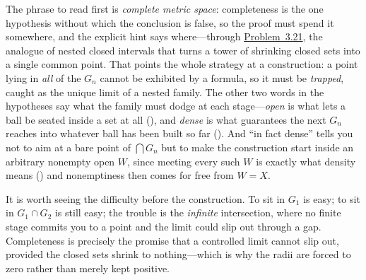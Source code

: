 \documentclass[main.tex]{subfiles}
\begin{document}
\begin{Reflection}
The phrase to read first is \emph{complete metric space}: completeness is the one hypothesis without which
the conclusion is false, so the proof must spend it somewhere, and the explicit hint says where---through
\hyperlink{prob:3.21}{Problem~3.21}, the analogue of nested closed intervals that turns a tower of
shrinking closed sets into a single common point. That points the whole strategy at a construction: a
point lying in \emph{all} of the $G_n$ cannot be exhibited by a formula, so it must be \emph{trapped},
caught as the unique limit of a nested family. The other two words in the hypotheses say what the family
must dodge at each stage---\emph{open} is what lets a ball be seated inside a set at all (),
and \emph{dense} is what guarantees the next $G_n$ reaches into whatever ball has been built so far
(). And ``in fact dense'' tells you not to aim at a bare point of $\bigcap G_n$ but to make
the construction start inside an arbitrary nonempty open $W$, since meeting every such $W$ is exactly what
density means () and nonemptiness then comes for free from $W=X$.

It is worth seeing the difficulty before the construction. To sit in $G_1$ is easy; to sit in $G_1\cap
G_2$ is still easy; the trouble is the \emph{infinite} intersection, where no finite stage commits you to
a point and the limit could slip out through a gap. Completeness is precisely the promise that a
controlled limit cannot slip out, provided the closed sets shrink to nothing---which is why the radii are
forced to zero rather than merely kept positive.


\end{Reflection}
\end{document}
